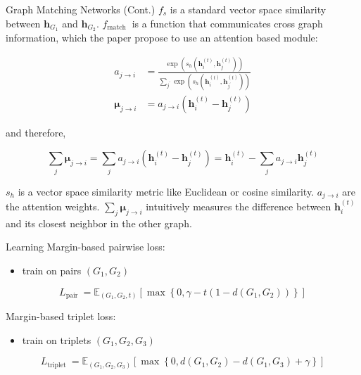 \documentclass{beamer}
\begin{document}
\begin{frame}{Graph Matching Networks (Cont.)}
$f_{s}$ is a standard vector space similarity between $\mathbf{h}_{G_{1}}$ and $\mathbf{h}_{G_{2}}$. 
$f_{\text {match }}$ is a function that communicates cross graph information, which the paper propose to use an attention based module:
\begin{tiny}
\begin{equation}
\begin{aligned}
a_{j \rightarrow i} &=\frac{\exp \left(s_{h}\left(\mathbf{h}_{i}^{(t)}, \mathbf{h}_{j}^{(t)}\right)\right)}{\sum_{j^{\prime}} \exp \left(s_{h}\left(\mathbf{h}_{i}^{(t)}, \mathbf{h}_{j^{\prime}}^{(t)}\right)\right)} \\
\boldsymbol{\mu}_{j \rightarrow i} &=a_{j \rightarrow i}\left(\mathbf{h}_{i}^{(t)}-\mathbf{h}_{j}^{(t)}\right)
\end{aligned}
\end{equation}
\end{tiny}
and therefore,
\begin{tiny}
\begin{equation}
\sum_{j} \boldsymbol{\mu}_{j \rightarrow i}=\sum_{j} a_{j \rightarrow i}\left(\mathbf{h}_{i}^{(t)}-\mathbf{h}_{j}^{(t)}\right)=\mathbf{h}_{i}^{(t)}-\sum_{j} a_{j \rightarrow i} \mathbf{h}_{j}^{(t)}
\end{equation}
\end{tiny}
$s_{h}$ is a vector space similarity metric like Euclidean or cosine similarity. $a_{j \rightarrow i}$ are the attention weights. $\sum_{j} \boldsymbol{\mu}_{j \rightarrow i}$ intuitively measures the difference between $\mathbf{h}_{i}^{(t)}$ and its closest neighbor in the other graph. 
\end{frame}

\begin{frame}{Learning}
Margin-based pairwise loss:
\begin{itemize}
    \item train on pairs $(G_1, G_2)$
\end{itemize}
$$
L_{\text {pair }}=\mathbb{E}_{\left(G_{1}, G_{2}, t\right)}\left[\max \left\{0, \gamma-t\left(1-d\left(G_{1}, G_{2}\right)\right)\right\}\right]
$$

Margin-based triplet loss:
\begin{itemize}
    \item train on triplets $(G_1, G_2, G_3)$
\end{itemize}
$$
L_{\text {triplet }}=\mathbb{E}_{\left(G_{1}, G_{2}, G_{3}\right)}\left[\max \left\{0, d\left(G_{1}, G_{2}\right)-d\left(G_{1}, G_{3}\right)+\gamma\right\}\right]
$$
\end{frame}
\end{document}

